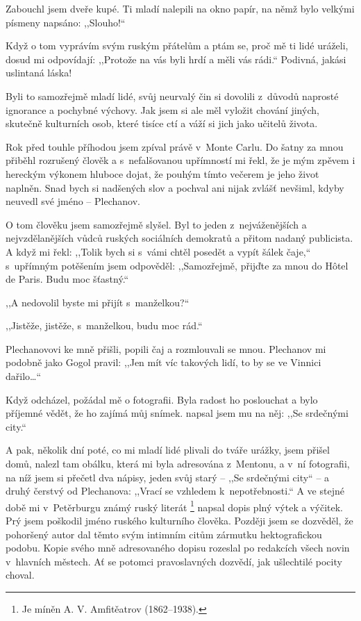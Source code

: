 Zabouchl jsem dveře kupé. Ti mladí nalepili na okno papír, na němž bylo velkými písmeny napsáno: ,,Slouho!``

Když o tom vyprávím svým ruským přátelům a ptám se, proč mě ti lidé uráželi, dosud mi odpovídají: ,,Protože na vás byli hrdí a měli vás rádi.`` 
Podivná, jakási uslintaná láska!

Byli to samozřejmě mladí lidé, svůj neurvalý čin si dovolili z důvodů naprosté ignorance a pochybné výchovy. Jak jsem si ale měl vyložit chování jiných, skutečně kulturních osob, které tisíce ctí a váží si jich jako učitelů života. 

Rok před touhle příhodou jsem zpíval právě v Monte Carlu. Do šatny za mnou přiběhl rozrušený člověk a s nefalšovanou upřímností mi řekl, že je mým zpěvem i hereckým výkonem hluboce dojat, že pouhým tímto večerem je jeho život naplněn. Snad bych si nadšených slov a pochval ani nijak zvlášť nevšiml, kdyby neuvedl své jméno -- Plechanov.

O tom člověku jsem samozřejmě slyšel. Byl to jeden z nejváženějších a nejvzdělanějších vůdců ruských sociálních demokratů a přitom nadaný publicista. A když mi řekl: ,,Tolik bych si s vámi chtěl posedět a vypít šálek čaje,`` s upřímným potěšením jsem odpověděl: ,,Samozřejmě, přijďte za mnou do Hôtel de Paris. Budu moc šťastný.`` 

,,A nedovolil byste mi přijít s manželkou?``

,,Jistěže, jistěže, s manželkou, budu moc rád.`` 

Plechanovovi ke mně přišli, popili čaj a rozmlouvali se mnou. Plechanov mi podobně jako Gogol pravil: ,,Jen mít víc takových lidí, to by se ve Vinnici dařilo\ldots``

Když odcházel, požádal mě o fotografii. Byla radost ho poslouchat a bylo příjemné vědět, že ho zajímá můj snímek. napsal jsem mu na něj: ,,Se srdečnými city.``

A pak, několik dní poté, co mi mladí lidé plivali do tváře urážky, jsem přišel domů, nalezl tam obálku, která mi byla adresována z Mentonu, a v ní fotografii, na níž jsem si přečetl dva nápisy, jeden svůj starý -- ,,Se srdečnými city`` -- a druhý čerstvý od Plechanova: ,,Vrací se vzhledem k nepotřebnosti.`` A ve stejné době mi v Petěrburgu známý ruský literát \footnote{Je míněn A. V. Amfitěatrov (1862--1938).} napsal dopis plný výtek a výčitek. Prý jsem poškodil jméno ruského kulturního člověka. Později jsem se dozvěděl, že pohoršený autor dal těmto svým intimním citům zármutku hektografickou podobu. Kopie svého mně adresovaného dopisu rozeslal po redakcích všech novin v hlavních městech. Ať se potomci pravoslavných dozvědí, jak ušlechtilé pocity choval.

